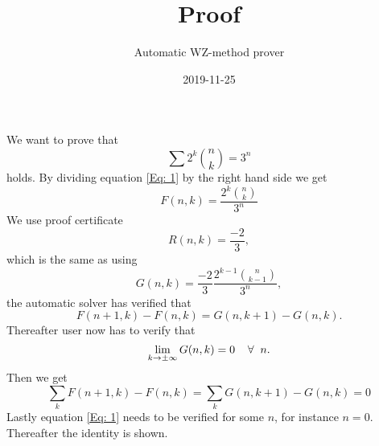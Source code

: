 \documentclass{article}
\title{Proof}
\author{Automatic WZ-method prover}
\date{2019-11-25}
\let\oldforall\forall
\renewcommand{\forall}{\hspace*{2mm}\oldforall\hspace*{1mm}}
\begin{document}
\maketitle
We want to prove that
\begin{equation}\label{Eq: 1}
\sum 2^k\binom{n}{k} = 3^n
\end{equation}
holds. By dividing equation \ref{Eq: 1} by the right hand side we get
\begin{equation}
F(n,k)=\frac{2^{k}\binom{n}{k}}{3^{n}}
\end{equation}
We use proof certificate
\begin{equation}
R(n,k)=\frac{-2}{3},
\end{equation}
which is the same as using
\begin{equation}
G(n,k)=\frac{-2}{3}\frac{2^{k-1}\binom{n}{k-1}}{3^{n}},
\end{equation}
the automatic solver has  verified that
\begin{equation}\label{Eq: WZ1}
F(n+1,k)-F(n,k)=G(n,k+1)-G(n,k).
\end{equation}
Thereafter user now has to verify that
\begin{equation}
\lim_{k\to\pm\infty}G(n,k)=0\forall n.
\end{equation}
Then we get
\begin{equation}
\sum_k F(n+1,k)-F(n,k)=\sum_k G(n,k+1)-G(n,k)=0\end{equation}Lastly equation \ref{Eq: 1} needs to be verified for some $n$, for instance $n=0$. Thereafter the identity is shown.
\end{document}
